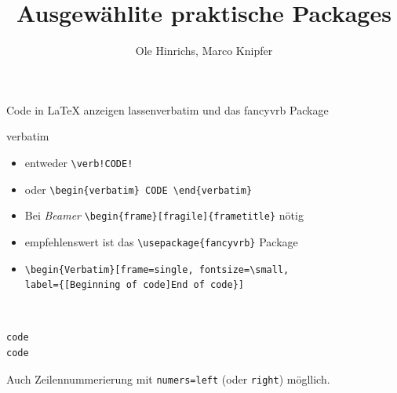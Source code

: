 \documentclass[ngerman, hyperref={pdfpagelabels=false}]{beamer}
\title[\LaTeX-Einführung]{Ausgewählite praktische Packages}
\institute{Fachschaft Physik}
\author[Ole, Marco]{Ole Hinrichs, Marco Knipfer}
\begin{document}
 


\begin{frame}[fragile]{Code in \LaTeX{} anzeigen lassen}{verbatim und das fancyvrb Package}
    \begin{block}{verbatim}
        \begin{itemize}
            \item entweder \verb+\verb!CODE!+
            \item oder \verb!\begin{verbatim} CODE \end{verbatim}!
                \pause
            \item Bei \textit{Beamer}
                \verb!\begin{frame}[fragile]{frametitle}! nötig
            \item empfehlenswert ist das \verb!\usepackage{fancyvrb}! Package
            \item 
            \begin{small}
                \begin{verbatim}
\begin{Verbatim}[frame=single, fontsize=\small, 
label={[Beginning of code]End of code}]
                \end{verbatim}
            \end{small}
        \end{itemize}
    \end{block}
    ~\\
    \begin{Verbatim}[frame=single, fontsize=\small, 
        label={[Beginning of code]End of code}]
code
code
    \end{Verbatim}
\pause
Auch Zeilennummerierung mit \verb!numers=left! (oder \verb!right!) mögllich.
\end{frame}
\end{document}
